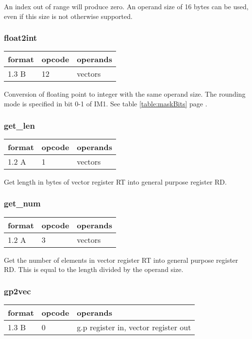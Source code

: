 \documentclass[forwardcom.tex]{subfiles}
\begin{document}
An index out of range will produce zero. An operand size of 16 bytes can be used, even if this size is not otherwise supported.

\subsubsection{float2int}
\label{table:extractInstruction}
\begin{tabular}{|p{12mm}|p{12mm}|p{110mm}|}
\hline
\bfseries format & \bfseries opcode & \bfseries operands \\ \hline
1.3 B & 12 & vectors  \\ \hline
\end{tabular}
\vspace{2mm}

Conversion of floating point to integer with the same operand size. The rounding mode is specified in bit 0-1 of IM1. See table \ref{table:maskBits} page \pageref{table:maskBits}.

\subsubsection{get\_len}
\label{table:getLenInstruction}
\begin{tabular}{|p{12mm}|p{12mm}|p{110mm}|}
\hline
\bfseries format & \bfseries opcode & \bfseries operands \\ \hline
1.2 A & 1 & vectors  \\ \hline
\end{tabular}
\vspace{2mm}

Get length in bytes of vector register RT into general purpose register RD.

\subsubsection{get\_num}
\label{table:getNumInstruction}
\begin{tabular}{|p{12mm}|p{12mm}|p{110mm}|}
\hline
\bfseries format & \bfseries opcode & \bfseries operands \\ \hline
1.2 A & 3 & vectors  \\ \hline
\end{tabular}
\vspace{2mm}

Get the number of elements in vector register RT into general purpose register RD. This is equal to the length divided by the operand size.

\subsubsection{gp2vec}
\label{table:gp2vecInstruction}
\begin{tabular}{|p{12mm}|p{12mm}|p{110mm}|}
\hline
\bfseries format & \bfseries opcode & \bfseries operands \\ \hline
1.3 B & 0 & g.p register in, vector register out \\ \hline
\end{tabular}
\vspace{2mm}
\end{document}
